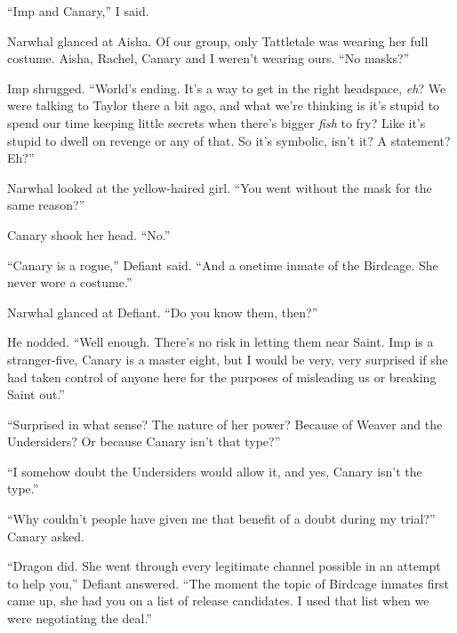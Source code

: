 ``Imp and Canary,'' I said.



Narwhal glanced at Aisha.  Of our group, only Tattletale was wearing her full costume.  Aisha, Rachel, Canary and I weren't wearing ours.  ``No masks?''



Imp shrugged.  ``World's ending.  It's a way to get in the right headspace, \emph{eh}?  We were talking to Taylor there a bit ago, and what we're thinking is it's stupid to spend our time keeping little secrets when there's bigger \emph{fish} to fry?  Like it's stupid to dwell on revenge or any of that.  So it's symbolic, isn't it?  A statement?  Eh?''



Narwhal looked at the yellow-haired girl.  ``You went without the mask for the same reason?''



Canary shook her head.  ``No.''



``Canary is a rogue,'' Defiant said.  ``And a onetime inmate of the Birdcage.  She never wore a costume.''



Narwhal glanced at Defiant.  ``Do you know them, then?''



He nodded.  ``Well enough.  There's no risk in letting them near Saint. Imp is a stranger-five, Canary is a master eight, but I would be very, very surprised if she had taken control of anyone here for the purposes of misleading us or breaking Saint out.''



``Surprised in what sense?  The nature of her power?  Because of Weaver and the Undersiders?  Or because Canary isn't that type?''



``I somehow doubt the Undersiders would allow it, and yes, Canary isn't the type.''



``Why couldn't people have given me that benefit of a doubt during my trial?'' Canary asked.



``Dragon did.  She went through every legitimate channel possible in an attempt to help you,'' Defiant answered.  ``The moment the topic of Birdcage inmates first came up, she had you on a list of release candidates.  I used that list when we were negotiating the deal.''



